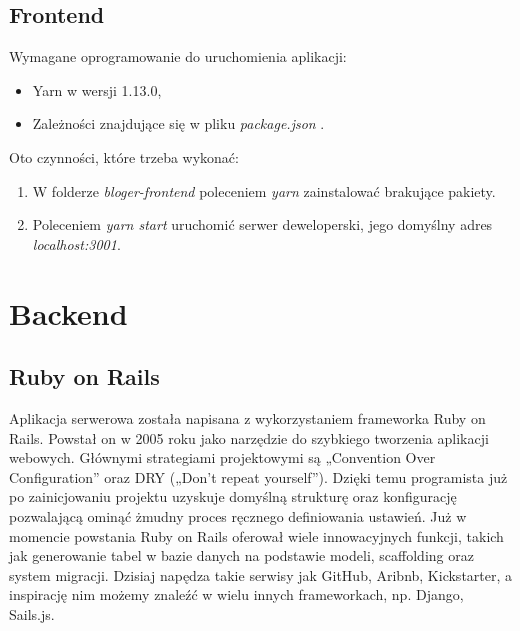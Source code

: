 \documentclass[declaration,shortabstract]{iithesis}
\begin{document}
\subsection{Frontend}
Wymagane oprogramowanie do uruchomienia aplikacji:
    \begin{itemize}
        \item Yarn w wersji 1.13.0,
        \item Zależności znajdujące się w pliku \textit{package.json} .
    \end{itemize}

Oto czynności, które trzeba wykonać:
\begin{enumerate}
    \item W folderze \textit{bloger-frontend} poleceniem \textit{yarn} zainstalować brakujące pakiety.
    \item Poleceniem \textit{yarn start} uruchomić serwer deweloperski, jego domyślny adres \textit{localhost:3001}.
\end{enumerate}

\section{Backend}
\subsection{Ruby on Rails}
Aplikacja serwerowa została napisana z wykorzystaniem frameworka Ruby on Rails. Powstał on w 2005 roku jako narzędzie do szybkiego tworzenia aplikacji webowych. Głównymi strategiami projektowymi są „Convention Over Configuration” oraz DRY („Don’t repeat yourself”). Dzięki temu programista już po zainicjowaniu projektu uzyskuje domyślną strukturę oraz konfigurację pozwalającą ominąć żmudny proces ręcznego definiowania ustawień. Już w momencie powstania Ruby on Rails oferował wiele innowacyjnych funkcji, takich jak generowanie tabel w bazie danych na podstawie modeli, scaffolding oraz system migracji. Dzisiaj napędza takie serwisy jak GitHub, Aribnb, Kickstarter, a inspirację nim możemy znaleźć w wielu innych frameworkach, np. Django, Sails.js.
\end{document}
